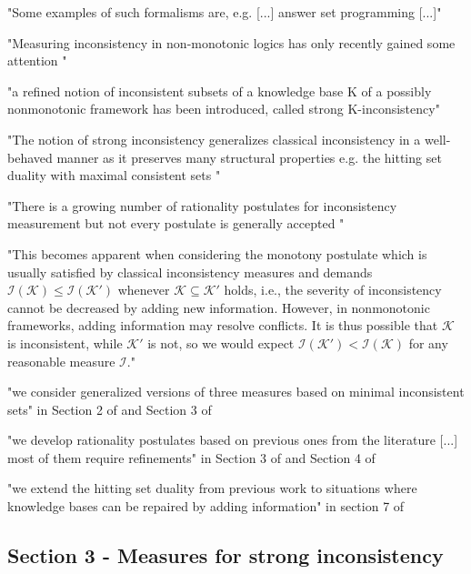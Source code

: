 "Some examples of such formalisms are, e.g. [...] answer set programming \cite{gelfond_logic_2002} [...]"

"Measuring inconsistency in non-monotonic logics has only recently gained some attention \cite{ulbricht_measuring_2018} \cite{brewka_strong_2019} \cite{michael_measuring_2016} \cite{brewka_strong_2017}"

"a refined notion of inconsistent subsets of a knowledge base K of a possibly nonmonotonic framework has been introduced, called strong K-inconsistency"
\cite{brewka_strong_2017}

"The notion of strong inconsistency generalizes classical inconsistency in a well-behaved manner as it preserves many structural properties e.g. the hitting set duality with maximal consistent sets \cite{reiter_theory_1987}"

"There is a growing number of rationality postulates for inconsistency measurement but not every postulate is generally accepted \cite{hameurlain_basic_2017} \cite{ferme_revisiting_2014}"

"This becomes apparent when considering the monotony postulate which is usually satisfied by classical inconsistency measures and demands \(\mathcal{I}(\mathcal{K}) \leq \mathcal{I}(\mathcal{K}')\) whenever \(\mathcal{K} \subseteq \mathcal{K}'\) holds, i.e., the severity of inconsistency cannot be decreased by adding new information. However, in nonmonotonic frameworks, adding information may resolve conflicts. It is thus possible that \(\mathcal{K}\) is inconsistent, while \(\mathcal{K}'\) is not, so we would expect \(\mathcal{I}(\mathcal{K}') < \mathcal{I}(\mathcal{K})\) for any reasonable measure \(\mathcal{I}\)."

"we consider generalized versions of three measures based on minimal inconsistent sets" in Section 2 of \cite{ulbricht_measuring_2018} and Section 3 of \cite{ulbricht_handling_2020}

"we develop rationality postulates based on previous ones from the literature [...] most of them require refinements" in Section 3 of \cite{ulbricht_measuring_2018} and Section 4 of \cite{ulbricht_handling_2020}

"we extend the hitting set duality from previous work \cite{brewka_strong_2019} to situations where knowledge bases can be repaired by adding information" in section 7 of \cite{ulbricht_handling_2020}

\subsection{Section 3 - Measures for strong inconsistency}
\cite{ulbricht_handling_2020}

